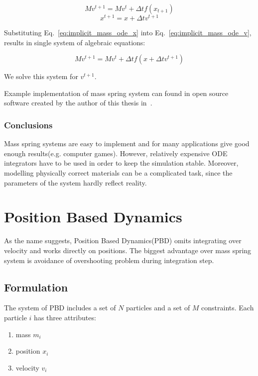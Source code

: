 \documentclass[en]{minipw} %
\begin{document}
\begin{equation}
\label{eq:implicit_mass_ode_v}
M v^{t+1} = M v^{t} + \Delta t f(x_{t+1})
\end{equation}
\begin{equation}
\label{eq:implicit_mass_ode_x}
x^{t+1} = x + \Delta t v^{t+1}
\end{equation}

Substituting Eq.~\ref{eq:implicit_mass_ode_x} into Eq.~\ref{eq:implicit_mass_ode_v}, results in single system of algebraic equations:

\begin{equation}
M v^{t+1} = M v^{t} + \Delta t f(x + \Delta t v^{t+1})
\end{equation}

We solve this system for $v^{t+1}$.

Example implementation of mass spring system can found in open source software created by the author of this thesis in~\cite{JC-MassSpring}. 

\subsubsection{Conclusions}
Mass spring systems are easy to implement and for many applications give good enough results(e.g. computer games). However, relatively expensive ODE integrators have to be used in order to keep the simulation stable. Moreover, modelling physically correct materials can be a complicated task, since the parameters of the system hardly reflect reality.

\section{Position Based Dynamics}
As the name suggests, Position Based Dynamics(PBD) omits integrating over velocity and works directly on positions. The biggest advantage over mass spring system is avoidance of overshooting problem during integration step.
\subsection{Formulation}
The system of PBD includes a set of $N$ particles and a set of $M$ constraints. Each particle $i$ has three attributes: 
\begin{enumerate}
\item mass $m_i$
\item position $x_i$
\item velocity $v_i$
\end{enumerate}
\end{document}
